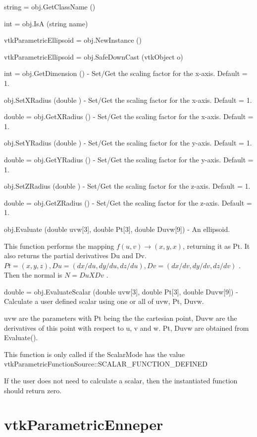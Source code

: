 \begin{DoxyItemize}
\item {\ttfamily string = obj.\-Get\-Class\-Name ()}  
\item {\ttfamily int = obj.\-Is\-A (string name)}  
\item {\ttfamily vtk\-Parametric\-Ellipsoid = obj.\-New\-Instance ()}  
\item {\ttfamily vtk\-Parametric\-Ellipsoid = obj.\-Safe\-Down\-Cast (vtk\-Object o)}  
\item {\ttfamily int = obj.\-Get\-Dimension ()} -\/ Set/\-Get the scaling factor for the x-\/axis. Default = 1.  
\item {\ttfamily obj.\-Set\-X\-Radius (double )} -\/ Set/\-Get the scaling factor for the x-\/axis. Default = 1.  
\item {\ttfamily double = obj.\-Get\-X\-Radius ()} -\/ Set/\-Get the scaling factor for the x-\/axis. Default = 1.  
\item {\ttfamily obj.\-Set\-Y\-Radius (double )} -\/ Set/\-Get the scaling factor for the y-\/axis. Default = 1.  
\item {\ttfamily double = obj.\-Get\-Y\-Radius ()} -\/ Set/\-Get the scaling factor for the y-\/axis. Default = 1.  
\item {\ttfamily obj.\-Set\-Z\-Radius (double )} -\/ Set/\-Get the scaling factor for the z-\/axis. Default = 1.  
\item {\ttfamily double = obj.\-Get\-Z\-Radius ()} -\/ Set/\-Get the scaling factor for the z-\/axis. Default = 1.  
\item {\ttfamily obj.\-Evaluate (double uvw\mbox{[}3\mbox{]}, double Pt\mbox{[}3\mbox{]}, double Duvw\mbox{[}9\mbox{]})} -\/ An ellipsoid.

This function performs the mapping $f(u,v) \rightarrow (x,y,x)$, returning it as Pt. It also returns the partial derivatives Du and Dv. $Pt = (x, y, z), Du = (dx/du, dy/du, dz/du), Dv = (dx/dv, dy/dv, dz/dv)$ . Then the normal is $N = Du X Dv$ .  
\item {\ttfamily double = obj.\-Evaluate\-Scalar (double uvw\mbox{[}3\mbox{]}, double Pt\mbox{[}3\mbox{]}, double Duvw\mbox{[}9\mbox{]})} -\/ Calculate a user defined scalar using one or all of uvw, Pt, Duvw.

uvw are the parameters with Pt being the the cartesian point, Duvw are the derivatives of this point with respect to u, v and w. Pt, Duvw are obtained from Evaluate().

This function is only called if the Scalar\-Mode has the value vtk\-Parametric\-Function\-Source\-::\-S\-C\-A\-L\-A\-R\-\_\-\-F\-U\-N\-C\-T\-I\-O\-N\-\_\-\-D\-E\-F\-I\-N\-E\-D

If the user does not need to calculate a scalar, then the instantiated function should return zero.


\end{DoxyItemize}\hypertarget{vtkcommon_vtkparametricenneper}{}\section{vtk\-Parametric\-Enneper}\label{vtkcommon_vtkparametricenneper}
